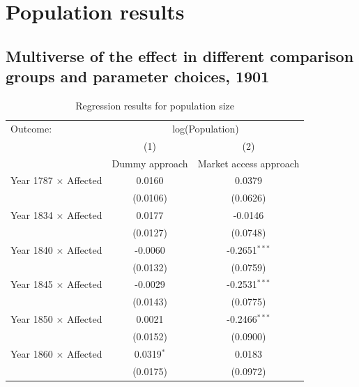 \FloatBarrier

\section{Population results}

\subsection{Multiverse of the effect in different comparison groups and parameter choices, 1901} 
\FloatBarrier
\begin{table}[H]
\centering
\caption{Regression results for population size} \label{tab:pop1}
\footnotesize
\begin{tabular}{lcc}
   \tabularnewline \midrule \midrule
   Outcome: & \multicolumn{2}{c}{log(Population)}\\
                                                    & (1)             & (2)\\  
                                                    & Dummy approach  & Market access approach\\  
   \midrule
   Year 1787 $\times$ Affected                       & 0.0160          & 0.0379\\   
                                                     & (0.0106)        & (0.0626)\\   
   Year 1834 $\times$ Affected                       & 0.0177          & -0.0146\\   
                                                     & (0.0127)        & (0.0748)\\   
   Year 1840 $\times$ Affected                       & -0.0060         & -0.2651$^{***}$\\   
                                                     & (0.0132)        & (0.0759)\\   
   Year 1845 $\times$ Affected                       & -0.0029         & -0.2531$^{***}$\\   
                                                     & (0.0143)        & (0.0775)\\   
   Year 1850 $\times$ Affected                       & 0.0021          & -0.2466$^{***}$\\   
                                                     & (0.0152)        & (0.0900)\\   
   Year 1860 $\times$ Affected                       & 0.0319$^{*}$    & 0.0183\\   
                                                     & (0.0175)        & (0.0972)\\   

\end{tabular}
\end{table}
